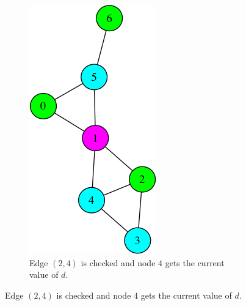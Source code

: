 \begin{figure}
\begin{subfigure}{0.20\textwidth}
\end{subfigure}
\hspace*{2cm} %
\begin{subfigure}{0.20\textwidth}
\includegraphics[width=\linewidth]{images/coloring/5.png}
\caption{Edge $(2,4)$ is checked and node $4$ gets the current value of $d$.} \label{fig:coloring6}

\end{subfigure}
\end{figure}
